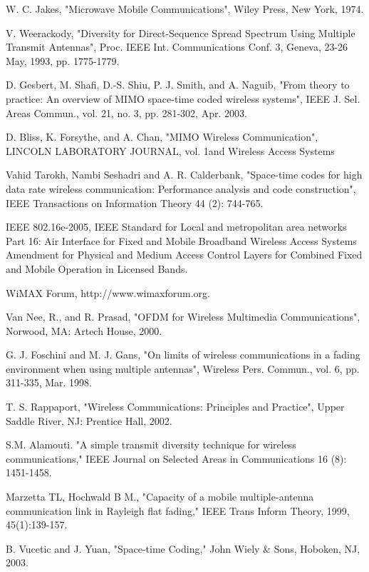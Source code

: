 \begin{thebibliography}{99}

W. C. Jakes, "Microwave Mobile Communications", Wiley Press, New
York, 1974.

V. Weerackody, "Diversity for Direct-Sequence Spread Spectrum Using
Multiple Transmit Antennas", Proc. IEEE Int. Communications Conf. 3,
Geneva, 23-26 May, 1993, pp. 1775-1779.

D. Gesbert, M. Shafi, D.-S. Shiu, P. J. Smith, and A. Naguib, "From
theory to practice: An overview of MIMO space-time coded wireless
systems", IEEE J. Sel. Areas Commun., vol. 21, no. 3, pp. 281-302,
Apr. 2003.

D. Bliss, K. Forsythe, and A. Chan, "MIMO Wireless Communication",
LINCOLN LABORATORY JOURNAL, vol. 1and Wireless Access Systems

Vahid Tarokh, Nambi Seshadri and A. R. Calderbank, "Space-time codes
for high data rate wireless communication: Performance analysis and
code construction", IEEE Transactions on Information Theory 44 (2):
744-765.

IEEE 802.16e-2005, IEEE Standard for Local and metropolitan area
networks Part 16: Air Interface for Fixed and Mobile Broadband
Wireless Access Systems Amendment for Physical and Medium Access
Control Layers for Combined Fixed and Mobile Operation in Licensed
Bands.

WiMAX Forum, http://www.wimaxforum.org.

Van Nee, R., and R. Prasad, "OFDM for Wireless Multimedia
Communications", Norwood, MA: Artech House, 2000.

G. J. Foschini and M. J. Gans, "On limits of wireless communications
in a fading environment when using multiple antennas", Wireless
Pers. Commun., vol. 6, pp. 311-335, Mar. 1998.

T. S. Rappaport, "Wireless Communications: Principles and Practice",
Upper Saddle River, NJ: Prentice Hall, 2002.

S.M. Alamouti. "A simple transmit diversity technique for wireless
communications," IEEE Journal on Selected Areas in Communications 16
(8): 1451-1458.

Marzetta TL, Hochwald B M., "Capacity of a mobile multiple-antenna
communication link in Rayleigh flat fading," IEEE Trans Inform
Theory, 1999, 45(1):139-157.

B. Vucetic and J. Yuan, "Space-time Coding," John Wiely \& Sons,
Hoboken, NJ, 2003.


\end{thebibliography}
